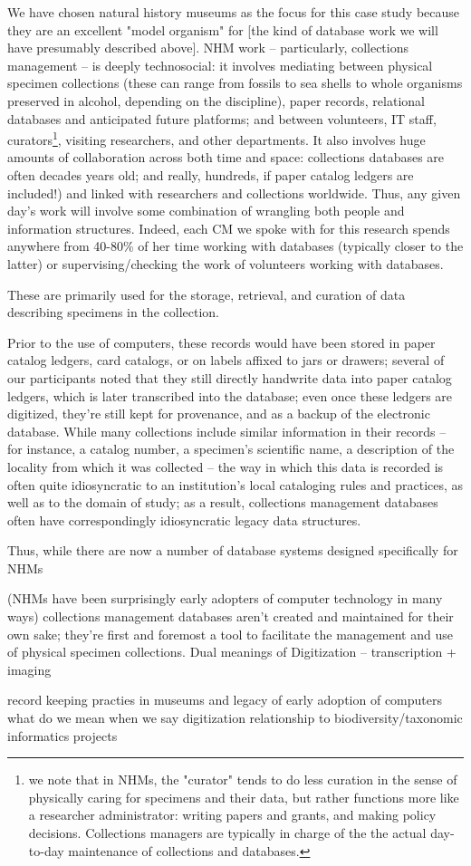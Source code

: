 We have chosen natural history museums as the focus for this case study because they are an excellent "model organism" for [the kind of database work we will have presumably described above]. NHM work -- particularly, collections management -- is deeply technosocial: it involves mediating between physical specimen collections (these can range from fossils to sea shells to whole organisms preserved in alcohol, depending on the discipline), paper records, relational databases and anticipated future platforms; and between volunteers, IT staff, curators\footnote{we note that in NHMs, the "curator" tends to do less curation in the sense of physically caring for specimens and their data, but rather functions more like a researcher administrator: writing papers and grants, and making policy decisions. Collections managers are typically in charge of the the actual day-to-day maintenance of collections and databases.}, visiting researchers, and other departments. It also involves huge amounts of collaboration across both time and space: collections databases are often decades years old; and really, hundreds, if paper catalog ledgers are included!) and linked with researchers and collections worldwide. Thus, any given day’s work will involve some combination of wrangling both people and information structures. Indeed, each CM we spoke with for this research spends anywhere from 40-80\% of her time working with databases (typically closer to the latter) or supervising/checking the work of volunteers working with databases.

These are primarily used for the storage, retrieval, and curation of data describing specimens in the collection.

Prior to the use of computers, these records would have been stored in paper catalog ledgers, card catalogs, or on labels affixed to jars or drawers; several of our participants noted that they still directly handwrite data into paper catalog ledgers, which is later transcribed into the database; even once these ledgers are digitized, they’re still kept for provenance, and as a backup of the electronic database. While many collections include similar information in their records – for instance, a catalog number, a specimen’s scientific name, a description of the locality from which it was collected – the way in which this data is recorded is often quite idiosyncratic to an institution’s local cataloging rules and practices, as well as to the domain of study; as a result, collections management databases often have correspondingly idiosyncratic legacy data structures.

Thus, while there are now a number of database systems designed specifically for NHMs

(NHMs have been surprisingly early adopters of computer technology in many ways)
collections management databases aren’t created and maintained for their own sake; they’re first and foremost a tool to facilitate the management and use of physical specimen collections. 
Dual meanings of Digitization – transcription + imaging


record keeping practies in museums and legacy of early adoption of computers
what do we mean when we say digitization
relationship to biodiversity/taxonomic informatics projects

